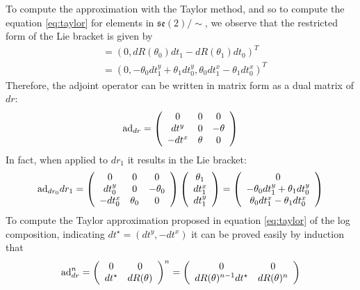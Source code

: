 To compute the approximation with the Taylor method, and so to compute the equation \ref{eq:taylor} for elements in  $ \mathfrak{se}(2)/\sim$, we observe that the restricted form of the Lie bracket is given by
\begin{align*}
[dr_0, dr_1] &= (0, dR(\theta_0)dt_1 - dR(\theta_1)dt_0)^T \\
& = (0, -\theta_0 dt^{y}_1 + \theta_1 dt^{y}_0 ,  \theta_0 dt^{x}_1 - \theta_1 dt^{x}_0)^T
\end{align*} 
Therefore, the adjoint operator can be written in matrix form as a dual matrix of $dr$:
\begin{align*}
\text{ad}_{dr} = 
\left (
\begin{array} {c c c}
0            &  0        &      0\\
dt^y       &  0        & - \theta \\
- dt^x   & \theta &  0
\end{array}
\right )
\end{align*} 
In fact, when applied to $dr_1$ it results in the Lie bracket:
\begin{align*}
\text{ad}_{dr_0} dr_1= 
\left (
\begin{array} {c c c}
0            &  0        &      0\\
dt^{y}_0       &  0        & - \theta_0 \\
- dt^{x}_0   & \theta_0 &  0
\end{array}
\right )
\left (
\begin{array} {c }
\theta_1   \\
dt^{x}_1   \\
dt^{y}_1 
\end{array}
\right )
=
\left (
\begin{array} {c }
0  \\
-\theta_0 dt^{y}_1+ \theta_1 dt^{y}_0\\ 
 \theta_0 dt^{x}_1- \theta_1 dt^{x}_0
\end{array}
\right )
\end{align*} 
To compute the Taylor approximation proposed in equation \ref{eq:taylor} of the log composition, indicating $dt^{\star} = (dt^{y}, - dt^{x})$ it can be proved easily by induction that
\begin{align*}
\text{ad}_{dr}^{n} 
= 
\left (
\begin{array} {c c}
0            &  0        \\
dt^{\star}      &  dR(\theta)      
\end{array}
\right )^n
=
\left (
\begin{array} {c c}
0            &  0        \\
dR(\theta)^{n-1}dt^{\star}      &  dR(\theta)^{n}      
\end{array}
\right )
\end{align*}

